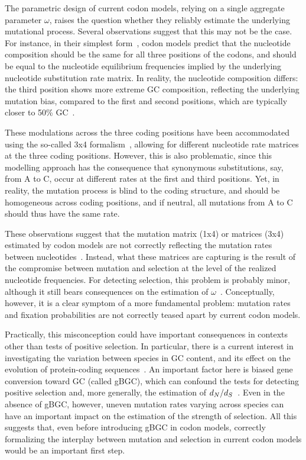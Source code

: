 \documentclass{article}
\begin{document}
The parametric design of current codon models, relying on a single aggregate parameter $\omega$, raises the question whether they reliably estimate the underlying mutational process.
Several observations suggest that this may not be the case.
For instance, in their simplest form~\citep{Muse1994, Goldman1994}, codon models predict that the nucleotide composition should be the same for all three positions of the codons, and should be equal to the nucleotide equilibrium frequencies implied by the underlying nucleotide {substitution} rate matrix.
In reality, the nucleotide composition differs: the third position shows more extreme GC composition, reflecting the underlying mutation bias, compared to the first and second positions, which are typically closer to 50\% GC~\citep{Singer2000}.

These modulations across the three coding positions have been accommodated using the so-called 3x4 formalism~\citep{Goldman1994, Pond2005a}, allowing for different nucleotide rate matrices at the three coding positions.
However, this is also problematic, since this modelling approach has the consequence that {synonymous} {substitutions}, say, from A to C, occur at different rates at the first and third positions.
Yet, in reality, the mutation process is blind to the coding structure, and should be homogeneous across coding positions, and if {neutral}, all mutations from A to C should thus have the same rate.

These observations suggest that the mutation matrix (1x4) or matrices (3x4) estimated by codon models are not correctly reflecting the mutation rates between nucleotides~\citep{Rodrigue2008a}.
Instead, what these matrices are capturing is the result of the compromise between mutation and selection at the level of the realized nucleotide frequencies.
For detecting selection, this problem is probably minor, although it still bears consequences on the estimation of $\omega$~\citep{Spielman2015}.
Conceptually, however, it is a clear symptom of a more fundamental problem: mutation rates and fixation probabilities are not correctly teased apart by current codon models.

Practically, this misconception could have important consequences in contexts other than tests of positive selection.
In particular, there is a current interest in investigating the variation between species in GC content, and its effect on the evolution of protein-coding sequences~\citep{Bolivar2019}.
An important factor here is biased gene conversion toward GC (called {gBGC}), which can confound the tests for detecting positive selection and, more generally, the estimation of $d_N / d_S$~\citep{Galtier2009,Ratnakumar2010, Figuet2014}.
Even in the absence of {gBGC}, however, uneven mutation rates varying across species can have an important impact on the estimation of the strength of selection.
All this suggests that, even before introducing {gBGC} in codon models, correctly formalizing the interplay between mutation and selection in current codon models would be an important first step.
\end{document}
